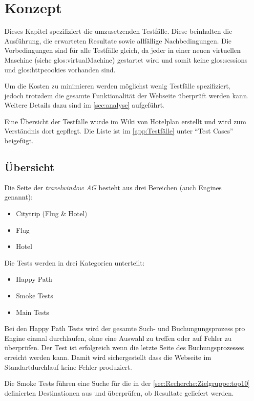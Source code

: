 
\chapter{Konzept}
\label{sec:konzept}
Dieses Kapitel spezifiziert die umzusetzenden Testfälle. Diese beinhalten die Ausführung, die erwarteten Resultate sowie allfällige Nachbedingungen. Die Vorbedingungen sind für alle Testfälle gleich, da jeder in einer neuen virtuellen Maschine (siehe \Gls{glos:virtualMachine}) gestartet wird und somit keine \Glspl{glos:session} und \Glspl{glos:httpcookie} vorhanden sind.

Um die Kosten zu minimieren werden möglichst wenig Testfälle spezifiziert, jedoch trotzdem die gesamte Funktionalität der Webseite überprüft werden kann. Weitere Details dazu sind im \cref{sec:analyse}  aufgeführt.

Eine Übersicht der Testfälle wurde im Wiki von Hotelplan erstellt und wird zum Verständnis dort gepflegt. Die Liste ist im \cref{app:Testfälle}  unter "`Test Cases"' beigefügt.

\section{Übersicht}
Die Seite der \textit{travelwindow AG} besteht aus drei Bereichen (auch Engines genannt):
\begin{itemize}
\item Citytrip (Flug \& Hotel)
\item Flug
\item Hotel
\end{itemize}

Die Tests werden in drei Kategorien unterteilt:
\begin{itemize}
\item Happy Path
\item Smoke Tests
\item Main Tests
\end{itemize}

Bei den Happy Path Tests wird der gesamte Such- und Buchungungsprozess pro Engine einmal durchlaufen, ohne eine Auswahl zu treffen oder auf Fehler zu überprüfen. Der Test ist erfolgreich wenn die letzte Seite des Buchungsprozesses erreicht werden kann. Damit wird sichergestellt dass die Webseite im Standartdurchlauf keine Fehler produziert.

Die Smoke Tests führen eine Suche für die in der \cref{sec:Recherche:Zielgruppe:top10}  definierten Destinationen aus und überprüfen, ob Resultate geliefert werden.

